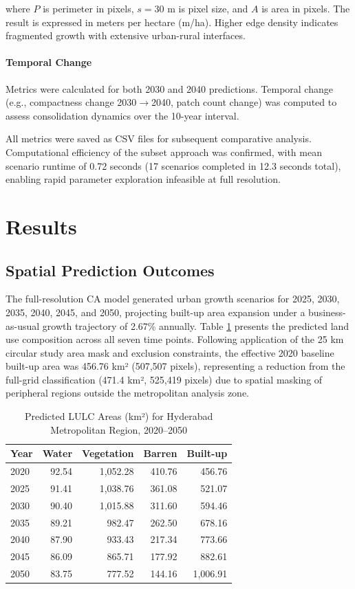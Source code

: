 \documentclass[conference]{IEEEtran}
\begin{document}
where $P$ is perimeter in pixels, $s = 30$ m is pixel size, and $A$ is area in pixels. The result is expressed in meters per hectare (m/ha). Higher edge density indicates fragmented growth with extensive urban-rural interfaces.

\paragraph{Temporal Change}
Metrics were calculated for both 2030 and 2040 predictions. Temporal change (e.g., compactness change 2030$\rightarrow$2040, patch count change) was computed to assess consolidation dynamics over the 10-year interval.

All metrics were saved as CSV files for subsequent comparative analysis. Computational efficiency of the subset approach was confirmed, with mean scenario runtime of 0.72 seconds (17 scenarios completed in 12.3 seconds total), enabling rapid parameter exploration infeasible at full resolution.
\section{Results}

\subsection{Spatial Prediction Outcomes}

The full-resolution CA model generated urban growth scenarios for 2025, 2030, 2035, 2040, 2045, and 2050, projecting built-up area expansion under a business-as-usual growth trajectory of 2.67\% annually. Table \ref{tab:spatial_results} presents the predicted land use composition across all seven time points. Following application of the 25 km circular study area mask and exclusion constraints, the effective 2020 baseline built-up area was 456.76 km² (507,507 pixels), representing a reduction from the full-grid classification (471.4 km², 525,419 pixels) due to spatial masking of peripheral regions outside the metropolitan analysis zone.

\begin{table}[!t]
\caption{Predicted LULC Areas (km²) for Hyderabad Metropolitan Region, 2020--2050}
\label{tab:spatial_results}
\centering
\small
\renewcommand{\arraystretch}{1.2}
\begin{tabular}{lrrrr}
\toprule
\textbf{Year} & \textbf{Water} & \textbf{Vegetation} & \textbf{Barren} & \textbf{Built-up} \\
\midrule
2020 & 92.54 & 1,052.28 & 410.76 & 456.76 \\
2025 & 91.41 & 1,038.76 & 361.08 & 521.07 \\
2030 & 90.40 & 1,015.88 & 311.60 & 594.46 \\
2035 & 89.21 & 982.47 & 262.50 & 678.16 \\
2040 & 87.90 & 933.43 & 217.34 & 773.66 \\
2045 & 86.09 & 865.71 & 177.92 & 882.61 \\
2050 & 83.75 & 777.52 & 144.16 & 1,006.91 \\
\bottomrule
\end{tabular}
\end{table}
\end{document}
